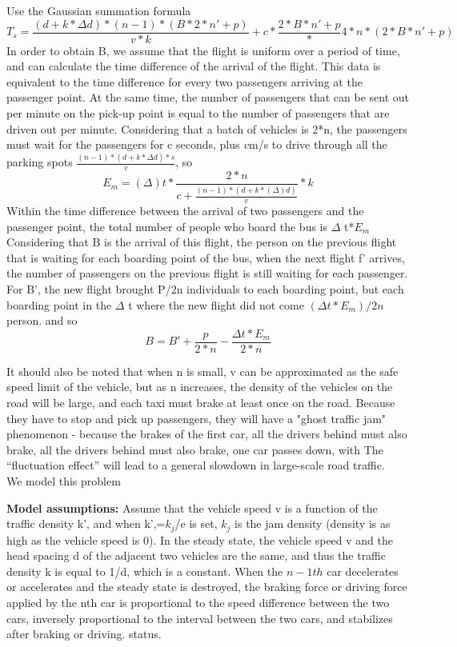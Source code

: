 Use the Gaussian summation formula
\begin{equation} T_{s} = \frac{{(d+k*\Delta d)}*{(n-1)}*{(B*2*n'+p)}}{v*k}+c*\frac{2*B*n'+p}*{4*n}*{(2*B*n'+p)}\end{equation}
In order to obtain B, we assume that the flight is uniform over a period of time, and can calculate the time difference of the arrival of the flight. This data is equivalent to the time difference for every two passengers arriving at the passenger point. At the same time, the number of passengers that can be sent out per minute on the pick-up point is equal to the number of passengers that are driven out per minute. Considering that a batch of vehicles is 2*n, the passengers must wait for the passengers for c seconds, plus $v$m/s to drive
through all the parking spots $\frac{(n-1)*(d+k*\Delta d)*s}{v}$, so
\begin{equation} E_{m} =(\Delta) t*\frac{2*n}{c+\frac{(n-1)*(d+k*(\Delta) d)}{v}}*k \end{equation}
Within the time difference between the arrival of two passengers and the passenger point, the total number of people who board the bus is $\Delta$ t*$E_m$
Considering that B is the arrival of this flight, the person on the previous flight that is waiting for each boarding point of the bus, when the next flight f' arrives, the number of passengers on the previous flight is still waiting for each passenger. For B', the new flight brought P/2n individuals to each boarding point, but each boarding point in the $\Delta$ t where the new flight did not come $(\Delta t*E_m)/2n$ person.
and so
\begin{equation} B =B'+\frac{p}{2*n}-\frac{\Delta t*E_m}{2*n} \end{equation}

It should also be noted that when n is small, v can be approximated as the safe speed limit of the vehicle, but as n increases, the density of the vehicles on the road will be large, and each taxi must brake at least once on the road. Because they have to stop and pick up passengers, they will have a "ghost traffic jam" phenomenon - because the brakes of the first car, all the drivers behind must also brake, all the drivers behind must also brake, one car passes down, with The “fluctuation effect” will lead to a general slowdown in large-scale road traffic.\\
We model this problem

\textbf{Model assumptions:}
Assume that the vehicle speed v is a function of the traffic density k', and when k',=$k_j$/e is set, $k_j$ is the jam density (density is as high as the vehicle speed is 0).
 In the steady state, the vehicle speed v and the head spacing d of the adjacent two vehicles are the same, and thus the traffic density k is equal to 1/d, which is a constant.
When the $n-1th$ car decelerates or accelerates and the steady state is destroyed, the braking force or driving force applied by the nth car is proportional to the speed difference between the two cars, inversely proportional to the interval between the two cars, and stabilizes after braking or driving. status.

